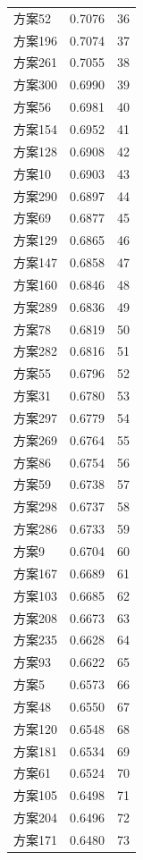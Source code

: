 \documentclass[12pt,a4paper]{article}
\begin{document}
\begin{table}[H]
\begin{tabular}{lcc}
    方案52 & 0.7076 & 36 \\
    方案196 & 0.7074 & 37 \\
    方案261 & 0.7055 & 38 \\
    方案300 & 0.6990 & 39 \\
    方案56 & 0.6981 & 40 \\
    方案154 & 0.6952 & 41 \\
    方案128 & 0.6908 & 42 \\
    方案10 & 0.6903 & 43 \\
    方案290 & 0.6897 & 44 \\
    方案69 & 0.6877 & 45 \\
    方案129 & 0.6865 & 46 \\
    方案147 & 0.6858 & 47 \\
    方案160 & 0.6846 & 48 \\
    方案289 & 0.6836 & 49 \\
    方案78 & 0.6819 & 50 \\
    方案282 & 0.6816 & 51 \\
    方案55 & 0.6796 & 52 \\
    方案31 & 0.6780 & 53 \\
    方案297 & 0.6779 & 54 \\
    方案269 & 0.6764 & 55 \\
    方案86 & 0.6754 & 56 \\
    方案59 & 0.6738 & 57 \\
    方案298 & 0.6737 & 58 \\
    方案286 & 0.6733 & 59 \\
    方案9 & 0.6704 & 60 \\
    方案167 & 0.6689 & 61 \\
    方案103 & 0.6685 & 62 \\
    方案208 & 0.6673 & 63 \\
    方案235 & 0.6628 & 64 \\
    方案93 & 0.6622 & 65 \\
    方案5 & 0.6573 & 66 \\
    方案48 & 0.6550 & 67 \\
    方案120 & 0.6548 & 68 \\
    方案181 & 0.6534 & 69 \\
    方案61 & 0.6524 & 70 \\
    方案105 & 0.6498 & 71 \\
    方案204 & 0.6496 & 72 \\
    方案171 & 0.6480 & 73 \\

\end{tabular}
\end{table}
\end{document}

